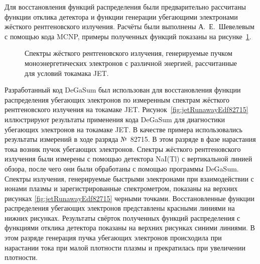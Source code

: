 Для восстановления функций распределения были предварительно рассчитаны функции отклика детектора и функции генерации убегающими электронами жёсткого рентгеновского излучения. Расчёты были выполнены А.~Е.~Шевелевым с помощью кода MCNP, примеры полученных функций показаны на рисунке~\ref{fig:jetGenerationFunctions}. 

\begin{figure}[ht!]
  \caption{ Спектры жёсткого рентгеновского излучения, генерируемые пучком моноэнергетических электронов с различной энергией, рассчитанные для условий токамака JET.~\cite{Shevelev2013} }
  \label{fig:jetGenerationFunctions}
\end{figure}


Разработанный код DeGaSum был использован для восстановления функции распределения убегающих электронов по измеренным спектрам жёсткого рентгеновского излучения на токамаке JET. Рисунок~\ref{fig:jetRunawayEdf82715} иллюстрируют результаты применения кода DeGaSum для диагностики убегающих электронов на токамаке JET. В качестве примера использовались результаты измерений в ходе разряда №~82715. В этом разряде в фазе нарастания тока возник пучок убегающих электронов. Спектры жёсткого рентгеновского излучения были измерены с помощью детектора NaI(Tl) с вертикальной линией обзора, после чего они были обработаны с помощью программы DeGaSum. Спектры излучения, генерируемые быстрыми электронами при взаимодействии с ионами плазмы и зарегистрированные спектрометром, показаны на верхних рисунках \ref{fig:jetRunawayEdf82715} черными точками. Восстановленные функции распределения убегающих электронов представлены красными линиями на нижних рисунках. Результаты свёрток полученных функций распределения с функциями отклика детектора показаны на верхних рисунках синими линиями. В этом разряде генерация пучка убегающих электронов происходила при нарастании тока при малой плотности плазмы и прекратилась при увеличении плотности.~\cite{Shevelev2013} 

